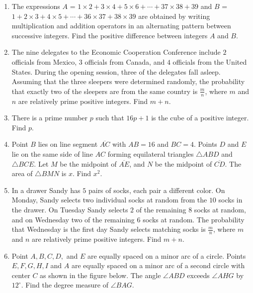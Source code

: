 \documentclass{article}
\begin{document}
\begin{enumerate}[label=\arabic*., itemsep=0.5em]\item The expressions \(A\) = \( 1 \times 2 + 3 \times 4 + 5 \times 6 + \cdots + 37 \times 38 + 39 \) and \(B\) = \( 1 + 2 \times 3 + 4 \times 5 + \cdots + 36 \times 37 + 38 \times 39 \) are obtained by writing multiplication and addition operators in an alternating pattern between successive integers.  Find the positive difference between integers \(A\) and \(B\).\par \vspace{0.5em}\item The nine delegates to the Economic Cooperation Conference include \(2\) officials from Mexico, \(3\) officials from Canada, and \(4\) officials from the United States. During the opening session, three of the delegates fall asleep. Assuming that the three sleepers were determined randomly, the probability that exactly two of the sleepers are from the same country is \(\frac{m}{n}\), where \(m\) and \(n\) are relatively prime positive integers. Find \(m+n\).\par \vspace{0.5em}\item There is a prime number \(p\) such that \(16p+1\) is the cube of a positive integer.  Find \(p\).\par \vspace{0.5em}\item Point \(B\) lies on line segment \(\overline{AC}\) with \(AB=16\) and \(BC=4\). Points \(D\) and \(E\) lie on the same side of line \(AC\) forming equilateral triangles \(\triangle ABD\) and \(\triangle BCE\). Let \(M\) be the midpoint of \(\overline{AE}\), and \(N\) be the midpoint of \(\overline{CD}\). The area of \(\triangle BMN\) is \(x\). Find \(x^2\).\par \vspace{0.5em}\item In a drawer Sandy has \(5\) pairs of socks, each pair a different color.  On Monday, Sandy selects two individual socks at random from the \(10\) socks in the drawer.  On Tuesday Sandy selects \(2\) of the remaining \(8\) socks at random, and on Wednesday two of the remaining \(6\) socks at random.  The probability that Wednesday is the first day Sandy selects matching socks is \(\frac{m}{n}\), where \(m\) and \(n\) are relatively prime positive integers. Find \(m+n\).\par \vspace{0.5em}\item Point \(A,B,C,D,\) and \(E\) are equally spaced on a minor arc of a circle. Points \(E,F,G,H,I\) and \(A\) are equally spaced on a minor arc of a second circle with center \(C\) as shown in the figure below. The angle \(\angle ABD\) exceeds \(\angle AHG\) by \(12^\circ\). Find the degree measure of \(\angle BAG\).



\end{enumerate}
\end{document}
